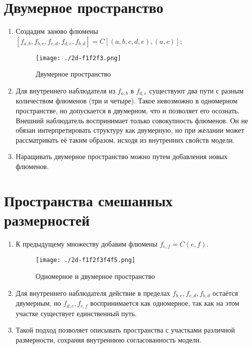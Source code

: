 \documentclass[final]{article}
\begin{document}
    \section{Двумерное пространство}
        \begin{enumerate}

            \item Создадим заново флюмены \( 
            [f_{a,b},f_{b,c},f_{c,d},f_{d,e},f_{b,d}]=C[(a,b,c,d,e),(a,c)] \);

            \begin{figure}[H]
                \centering
                \texttt{[image: ./2d-f1f2f3.png]}
                \caption{Двумерное пространство}
                \label{fig:image}
            \end{figure}

            \item Для внутреннего наблюдателя из \( f_{a,b} \) в \( f_{d,e} \) 
            существуют два пути с разным количеством флюменов (три и четыре). Такое 
            невозможно в одномерном пространстве, но допускается в двумерном, что и 
            позволяет его осознать. Внешний наблюдатель воспринимает только 
            совокупность флюменов. Он не обязан интерпретировать структуру как 
            двумерную, но при желании может рассматривать её таким образом, исходя 
            из внутренних свойств модели.

            \item Наращивать двумерное пространство можно путем добавления новых флюменов.
        \end{enumerate}



    \section{Пространства смешанных размерностей}
        \begin{enumerate}

            \item К предыдущему множеству добавим флюмены \( f_{e,f}=C(e,f) \).

            \begin{figure}[H]
                \centering
                \texttt{[image: ./2d-f1f2f3f4f5.png]}
                \caption{Одномерное и двумерное пространство }
                \label{fig:image}
            \end{figure}

            \item Для внутреннего наблюдателя действие в пределах \( 
            f_{b,c},f_{c,d},f_{b,d} \) остаётся двумерным, но \( f_{d,e},f_{e,f} \) 
            воспринимается как одномерное, так как на этом участке существует 
            единственный путь.

            \item Такой подход позволяет описывать пространства с участками 
            различной размерности, сохраняя внутреннюю согласованность модели.

        \end{enumerate}
\end{document}

